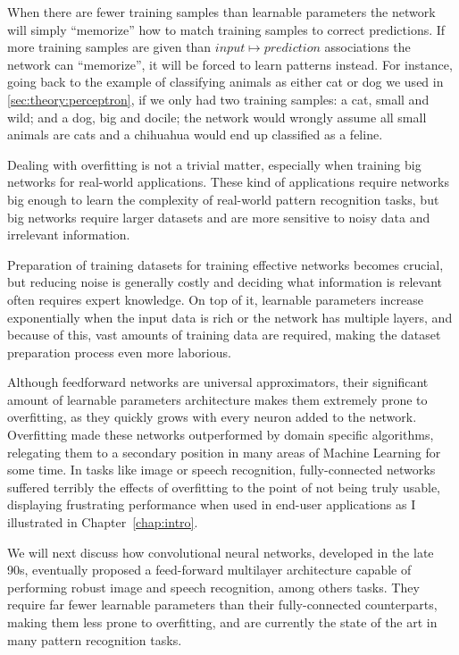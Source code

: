 When there are fewer training samples than learnable parameters the network will simply ``memorize'' how to match training samples to correct predictions.
If more training samples are given than $input \mapsto prediction$ associations the network can ``memorize'', it will be forced to learn patterns instead.
For instance, going back to the example of classifying animals as either cat or dog we used in \autoref{sec:theory:perceptron}, if we only had two training samples: a cat, small and wild; and a dog, big and docile; the network would wrongly assume all small animals are cats and a chihuahua would end up classified as a feline.

Dealing with overfitting is not a trivial matter, especially when training big networks for real-world applications.
These kind of applications require networks big enough to learn the complexity of real-world pattern recognition tasks, but big networks require larger datasets and are more sensitive to noisy data and irrelevant information.

Preparation of training datasets for training effective networks becomes crucial, but reducing noise is generally costly and deciding what information is relevant often requires expert knowledge.
On top of it, learnable parameters increase exponentially when the input data is rich or the network has multiple layers, and because of this, vast amounts of training data are required, making the dataset preparation process even more laborious.

Although feedforward networks are universal approximators, their significant amount of learnable parameters architecture makes them extremely prone to overfitting, as they quickly grows with every neuron added to the network.
Overfitting made these networks outperformed by domain specific algorithms, relegating them to a secondary position in many areas of Machine Learning for some time.
In tasks like image or speech recognition, fully-connected networks suffered terribly the effects of overfitting to the point of not being truly usable, displaying frustrating performance when used in end-user applications as I illustrated in Chapter~\ref{chap:intro}.

We will next discuss how convolutional neural networks, developed in the late 90s, eventually proposed a feed-forward multilayer architecture capable of performing robust image and speech recognition, among others tasks.
They require far fewer learnable parameters than their fully-connected counterparts, making them less prone to overfitting, and are currently the state of the art in many pattern recognition tasks.


